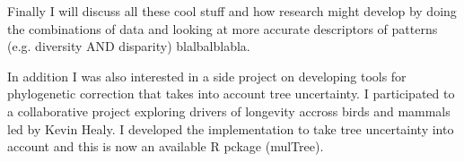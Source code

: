 Finally I will discuss all these cool stuff and how research might develop by doing the combinations of data and looking at more accurate descriptors of patterns (e.g. diversity AND disparity) blalbalblabla.

In addition I was also interested in a side project on developing tools for phylogenetic correction that takes into account tree uncertainty.
I participated to a collaborative project exploring drivers of longevity accross birds and mammals led by Kevin Healy.
I developed the implementation to take tree uncertainty into account and this is now an available R pckage (mulTree).
